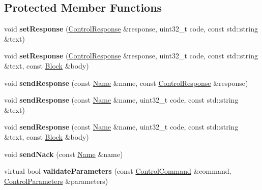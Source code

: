 \subsection*{Protected Member Functions}
\begin{DoxyCompactItemize}
\item 
void {\bfseries set\+Response} (\hyperlink{classndn_1_1mgmt_1_1ControlResponse}{Control\+Response} \&response, uint32\+\_\+t code, const std\+::string \&text)\hypertarget{classnfd_1_1ManagerBase_aebe6c7fcd4bbf88515b1e7cdf73c8392}{}\label{classnfd_1_1ManagerBase_aebe6c7fcd4bbf88515b1e7cdf73c8392}

\item 
void {\bfseries set\+Response} (\hyperlink{classndn_1_1mgmt_1_1ControlResponse}{Control\+Response} \&response, uint32\+\_\+t code, const std\+::string \&text, const \hyperlink{classndn_1_1Block}{Block} \&body)\hypertarget{classnfd_1_1ManagerBase_ae94e8b089068f1097a47df1fa000678d}{}\label{classnfd_1_1ManagerBase_ae94e8b089068f1097a47df1fa000678d}

\item 
void {\bfseries send\+Response} (const \hyperlink{classndn_1_1Name}{Name} \&name, const \hyperlink{classndn_1_1mgmt_1_1ControlResponse}{Control\+Response} \&response)\hypertarget{classnfd_1_1ManagerBase_a6dc3cdc46872ec1ee97353d92e96bd3d}{}\label{classnfd_1_1ManagerBase_a6dc3cdc46872ec1ee97353d92e96bd3d}

\item 
void {\bfseries send\+Response} (const \hyperlink{classndn_1_1Name}{Name} \&name, uint32\+\_\+t code, const std\+::string \&text)\hypertarget{classnfd_1_1ManagerBase_a868ef363033c6f9d686d70ee072cae23}{}\label{classnfd_1_1ManagerBase_a868ef363033c6f9d686d70ee072cae23}

\item 
void {\bfseries send\+Response} (const \hyperlink{classndn_1_1Name}{Name} \&name, uint32\+\_\+t code, const std\+::string \&text, const \hyperlink{classndn_1_1Block}{Block} \&body)\hypertarget{classnfd_1_1ManagerBase_a09ac5c15327f3711359cffa6dfaa1dae}{}\label{classnfd_1_1ManagerBase_a09ac5c15327f3711359cffa6dfaa1dae}

\item 
void {\bfseries send\+Nack} (const \hyperlink{classndn_1_1Name}{Name} \&name)\hypertarget{classnfd_1_1ManagerBase_a788985cf45de88635ffbb1ff9053199e}{}\label{classnfd_1_1ManagerBase_a788985cf45de88635ffbb1ff9053199e}

\item 
virtual bool {\bfseries validate\+Parameters} (const \hyperlink{classndn_1_1nfd_1_1ControlCommand}{Control\+Command} \&command, \hyperlink{classndn_1_1nfd_1_1ControlParameters}{Control\+Parameters} \&parameters)\hypertarget{classnfd_1_1ManagerBase_a66ac7b40cdb0d41012e65b5e38edbfc0}{}\label{classnfd_1_1ManagerBase_a66ac7b40cdb0d41012e65b5e38edbfc0}


\end{DoxyCompactItemize}
